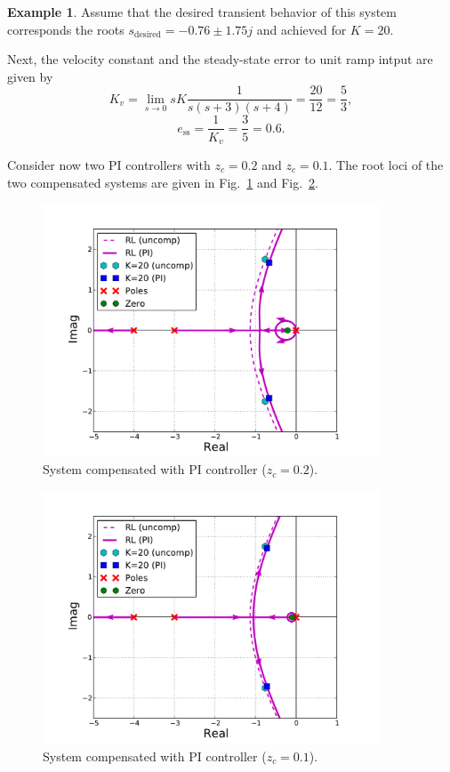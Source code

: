 \documentclass[a4paper,11pt]{report}
\theoremstyle{definition}
\newcommand{\des}{\textrm{desired}}
\newcommand{\sse}{\mathrm{ss}}
\newtheorem{mdexample}{Example}
\newenvironment{example}%
  {\vspace{0.1cm}\begin{mdframed}[backgroundcolor=lightgray]\begin{mdexample}}%
  {\end{mdexample}\end{mdframed}\vspace{0.1cm}}
\begin{document}
\begin{example}
  Assume that the desired transient behavior of this system
  corresponds the roots $s_\des=-0.76\pm 1.75j$ and achieved for
  $K=20$.

  Next, the velocity constant and the steady-state error to unit ramp
  intput are given by 
  \[
  K_v =  \lim_{s\to 0} sK\frac{1}{s(s+3)(s+4)} = \frac{20}{12} = \frac{5}{3},
  \]
  \[
  e_\sse = \frac{1}{K_v} = \frac{3}{5} = 0.6.
  \]

  Consider now two PI controllers with $z_c=0.2$ and $z_c=0.1$. The
  root loci of the two compensated systems are given in
  Fig.~\ref{fig:design-PI} and Fig.~\ref{fig:design-PI2}.

  \begin{figure}[H]
    \centering
    \includegraphics[width=10cm]{fig/design-PI.pdf}
    \caption{System compensated with PI controller ($z_c=0.2$).}
    \label{fig:design-PI}
  \end{figure}

  \begin{figure}[H]
    \centering
    \includegraphics[width=10cm]{fig/design-PI2.pdf}
    \caption{System compensated with PI controller ($z_c=0.1$).}
    \label{fig:design-PI2}
  \end{figure}


\end{example}
\end{document}
